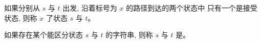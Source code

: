 \begin{frame}{}
  \begin{definition}
	如果分别从 $s$ 与 $t$ 出发, 沿着标号为 $x$ 的路径到达的两个状态中
	只有一个是接受状态, 则称 $x$ 了状态 $s$ 与 $t$。
  \end{definition}

  \pause
  \vspace{1.00cm}
  \begin{definition}
	如果存在某个能区分状态 $s$ 与 $t$ 的字符串,
	则称 $s$ 与 $t$ 是。
  \end{definition}
\end{frame}

